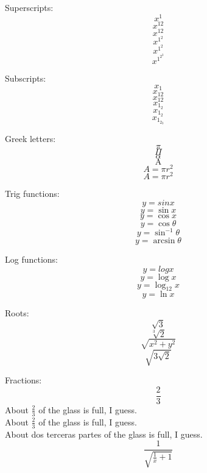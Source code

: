 \documentclass{article}
\newcommand{\Alpha}{\mathrm{A}}
\begin{document}
Superscripts:
\[x^1\] %
\[x^12\] %
\[x^{12}\] %
\[x^{1^2}\] %
\[x^{1^{2}}\] %
\[x^{1^{2^{3}}}\] %

Subscripts:
\[x_1\] %
\[x_12\] %
\[x_{12}\] %
\[x_{1_2}\] %
\[x_{1_{2}}\] %
\[x_{1_{2_{3}}}\] %


Greek letters:
\[\pi\]
\[\Pi\]
\[\alpha\] %
\[\Alpha\] %
\[A=\pi r^{2}\] %
\[A=\pi{}r^{2}\] %

Trig functions:
\[y=sin{}x\] %
\[y=\sin{x}\] %
\[y=\cos{x}\]
\[y=\cos{\theta}\] %
\[y=\sin^{-1}{\theta}\]
\[y=\arcsin{\theta}\] %

Log functions:
\[y=logx\] %
\[y=\log{x}\]
\[y=\log_{12}{x}\]
\[y=\ln{x}\]

Roots:
\[\sqrt{3}\]
\[\sqrt[3]{2}\] %
\[\sqrt{x^2+y^2}\]
\[\sqrt{3\sqrt{2}}\]

Fractions:
\[\frac{2}{3}\]
About \(\frac{2}{3}\) of the glass is full, I guess.\\
%
About \(\frac{2}{3}\) of the glass is full, I guess.\\ [2pt] %
%
About dos terceras partes of the glass is full, I guess. %
\[\frac{1}{\sqrt{\frac{1}{x}+1}}\]
\end{document}
